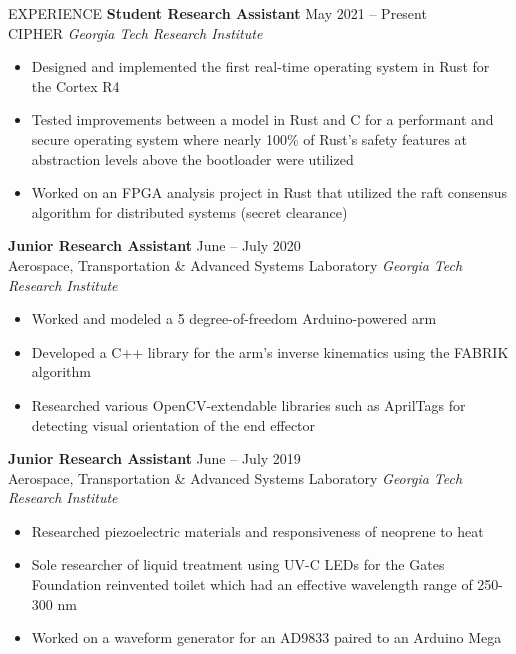\documentclass{resume} %
\begin{document}
\vspace{-0.8em}
\begin{rSection}{EXPERIENCE}
\textbf{Student Research Assistant} \hfill May 2021 -- Present\\
CIPHER \hfill \textit{Georgia Tech Research Institute}
\vspace{-0.5em}
 \begin{itemize}
    \itemsep -5pt {} 
     \item Designed and implemented the first real-time operating system in Rust for the Cortex R4
     \item Tested improvements between a model in Rust and C for a performant and secure operating system where
     nearly 100\% of Rust's safety features at abstraction levels above the bootloader were utilized
     \item Worked on an FPGA analysis project in Rust that utilized the raft consensus algorithm for distributed systems (secret clearance)
 \end{itemize}
\vspace{-0.5em}
\textbf{Junior Research Assistant} \hfill June -- July 2020\\
Aerospace, Transportation \& Advanced Systems Laboratory \hfill \textit{Georgia Tech Research Institute}
\vspace{-0.5em}
 \begin{itemize}
    \itemsep -5pt {} 
     \item Worked and modeled a 5 degree-of-freedom Arduino-powered arm
     \item Developed a C++ library for the arm's inverse kinematics using the FABRIK algorithm
     \item Researched various OpenCV-extendable libraries such as AprilTags for detecting visual orientation of the end effector
 \end{itemize}
 \vspace{-0.5em}
\textbf{Junior Research Assistant} \hfill June -- July 2019\\
Aerospace, Transportation \& Advanced Systems Laboratory \hfill \textit{Georgia Tech Research Institute}
\vspace{-0.5em}
 \begin{itemize}
    \itemsep -5pt {} 
     \item Researched piezoelectric materials and responsiveness of neoprene to heat
     \item Sole researcher of liquid treatment using UV-C LEDs for the Gates Foundation
     reinvented toilet which had an effective wavelength range of 250-300 nm
     \item Worked on a waveform generator for an AD9833 paired to an Arduino Mega
 \end{itemize}
\end{rSection} 
\end{document}
